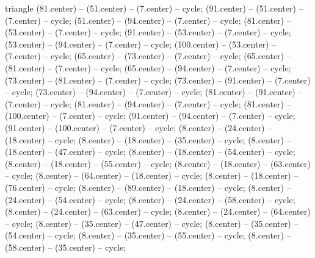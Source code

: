 \begin{pgfonlayer}{triangle}
 (81.center) -- (51.center) -- (7.center) -- cycle; 
 (91.center) -- (51.center) -- (7.center) -- cycle; 
 (51.center) -- (94.center) -- (7.center) -- cycle; 
 (81.center) -- (53.center) -- (7.center) -- cycle; 
 (91.center) -- (53.center) -- (7.center) -- cycle; 
 (53.center) -- (94.center) -- (7.center) -- cycle; 
 (100.center) -- (53.center) -- (7.center) -- cycle; 
 (65.center) -- (73.center) -- (7.center) -- cycle; 
 (65.center) -- (81.center) -- (7.center) -- cycle; 
 (65.center) -- (94.center) -- (7.center) -- cycle; 
 (73.center) -- (81.center) -- (7.center) -- cycle; 
 (73.center) -- (91.center) -- (7.center) -- cycle; 
 (73.center) -- (94.center) -- (7.center) -- cycle; 
 (81.center) -- (91.center) -- (7.center) -- cycle; 
 (81.center) -- (94.center) -- (7.center) -- cycle; 
 (81.center) -- (100.center) -- (7.center) -- cycle; 
 (91.center) -- (94.center) -- (7.center) -- cycle; 
 (91.center) -- (100.center) -- (7.center) -- cycle; 
 (8.center) -- (24.center) -- (18.center) -- cycle; 
 (8.center) -- (18.center) -- (35.center) -- cycle; 
 (8.center) -- (18.center) -- (47.center) -- cycle; 
 (8.center) -- (18.center) -- (54.center) -- cycle; 
 (8.center) -- (18.center) -- (55.center) -- cycle; 
 (8.center) -- (18.center) -- (63.center) -- cycle; 
 (8.center) -- (64.center) -- (18.center) -- cycle; 
 (8.center) -- (18.center) -- (76.center) -- cycle; 
 (8.center) -- (89.center) -- (18.center) -- cycle; 
 (8.center) -- (24.center) -- (54.center) -- cycle; 
 (8.center) -- (24.center) -- (58.center) -- cycle; 
 (8.center) -- (24.center) -- (63.center) -- cycle; 
 (8.center) -- (24.center) -- (64.center) -- cycle; 
 (8.center) -- (35.center) -- (47.center) -- cycle; 
 (8.center) -- (35.center) -- (54.center) -- cycle; 
 (8.center) -- (35.center) -- (55.center) -- cycle; 
 (8.center) -- (58.center) -- (35.center) -- cycle; 

\end{pgfonlayer}
